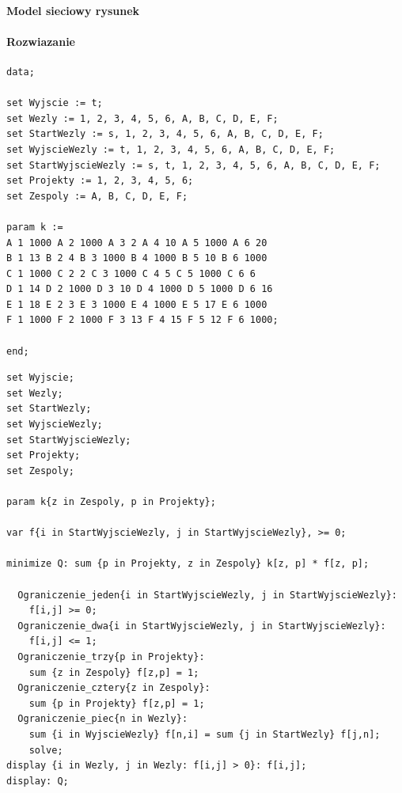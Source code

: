 \paragraph{Model sieciowy rysunek}

\paragraph{Rozwiazanie}
\begin{lstlisting}[caption= plik dat]
data; 
 
set Wyjscie := t; 
set Wezly := 1, 2, 3, 4, 5, 6, A, B, C, D, E, F; 
set StartWezly := s, 1, 2, 3, 4, 5, 6, A, B, C, D, E, F; 
set WyjscieWezly := t, 1, 2, 3, 4, 5, 6, A, B, C, D, E, F; 
set StartWyjscieWezly := s, t, 1, 2, 3, 4, 5, 6, A, B, C, D, E, F; 
set Projekty := 1, 2, 3, 4, 5, 6; 
set Zespoly := A, B, C, D, E, F; 
 
param k := 
A 1 1000 A 2 1000 A 3 2 A 4 10 A 5 1000 A 6 20
B 1 13 B 2 4 B 3 1000 B 4 1000 B 5 10 B 6 1000 
C 1 1000 C 2 2 C 3 1000 C 4 5 C 5 1000 C 6 6 
D 1 14 D 2 1000 D 3 10 D 4 1000 D 5 1000 D 6 16 
E 1 18 E 2 3 E 3 1000 E 4 1000 E 5 17 E 6 1000 
F 1 1000 F 2 1000 F 3 13 F 4 15 F 5 12 F 6 1000; 
 
end; 
\end{lstlisting}
\begin{lstlisting}[caption= plik mod]
set Wyjscie; 
set Wezly; 
set StartWezly; 
set WyjscieWezly; 
set StartWyjscieWezly; 
set Projekty; 
set Zespoly; 
 
param k{z in Zespoly, p in Projekty}; 
 
var f{i in StartWyjscieWezly, j in StartWyjscieWezly}, >= 0; 
 
minimize Q: sum {p in Projekty, z in Zespoly} k[z, p] * f[z, p]; 
 
  Ograniczenie_jeden{i in StartWyjscieWezly, j in StartWyjscieWezly}: 
    f[i,j] >= 0; 
  Ograniczenie_dwa{i in StartWyjscieWezly, j in StartWyjscieWezly}: 
    f[i,j] <= 1; 
  Ograniczenie_trzy{p in Projekty}: 
    sum {z in Zespoly} f[z,p] = 1; 
  Ograniczenie_cztery{z in Zespoly}: 
    sum {p in Projekty} f[z,p] = 1; 
  Ograniczenie_piec{n in Wezly}: 
    sum {i in WyjscieWezly} f[n,i] = sum {j in StartWezly} f[j,n]; 
	solve; 
display {i in Wezly, j in Wezly: f[i,j] > 0}: f[i,j]; 
display: Q;



\end{lstlisting}
